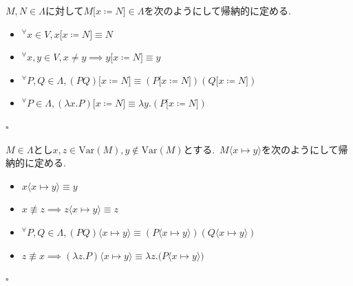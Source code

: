 \begin{definition}
$M, N \in \Lambda$に対して$M \lbrack x \coloneq N \rbrack \in \Lambda$を次のようにして帰納的に定める.
\begin{itemize}
    \item ${^{\forall}}x \in V, x \lbrack x \coloneq N \rbrack \equiv N$
    \item ${^{\forall}}x,y \in V, x \neq y \implies y \lbrack x \coloneq N \rbrack \equiv y$
    \item ${^{\forall}}P,Q \in \Lambda, (PQ) \lbrack x \coloneq N \rbrack \equiv (P \lbrack x \coloneq N \rbrack)(Q \lbrack x \coloneq N \rbrack)$
    \item ${^{\forall}}P \in \Lambda, (\lambda x.P) \lbrack x \coloneq N \rbrack \equiv \lambda y.(P \lbrack x \coloneq N \rbrack)$
\end{itemize}
\hfill $\square$
\end{definition}

\begin{definition}
$M \in \Lambda$とし$x, z \in \textrm{Var}(M), y \notin \textrm{Var}(M)$とする.\ $M \langle x \mapsto y\rangle$を次のようにして帰納的に定める.
\begin{itemize}
    \item $x \langle x \mapsto y \rangle \equiv y$
    \item $x \not\equiv z \implies z \langle x \mapsto y \rangle \equiv z$
    \item ${^{\forall}} P, Q \in \Lambda, (PQ) \langle x \mapsto y \rangle \equiv (P \langle x \mapsto y \rangle)(Q \langle x \mapsto y \rangle)$
    \item $z\not\equiv x \implies (\lambda z.P)\langle x \mapsto y\rangle \equiv \lambda z.\big(P\langle x \mapsto y\rangle\big)$
\end{itemize}
\hfill $\square$
\end{definition}